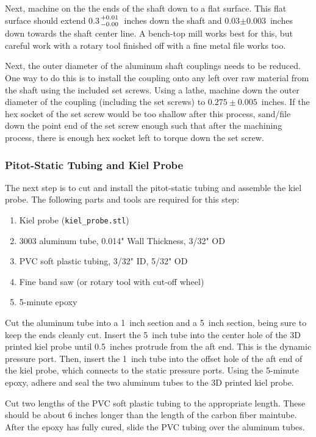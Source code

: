 \documentclass[10pt,onecolumn]{article}
\newcommand{\tol}[2]{\genfrac{}{}{0pt}{}{+#1}{-#2}}
\begin{document}
			Next, machine on the the ends of the shaft down to a flat surface. This flat surface should extend 0.3$\tol{0.01}{0.00}$~inches down the shaft and 0.03$\pm$0.003~inches down towards the shaft center line. A bench-top mill works best for this, but careful work with a rotary tool finished off with a fine metal file works too.
			
			Next, the outer diameter of the aluminum shaft couplings needs to be reduced. One way to do this is to install the coupling onto any left over raw material from the shaft using the included set screws. Using a lathe, machine down the outer diameter of the coupling (including the set screws) to $0.275\pm0.005$~inches. If the hex socket of the set screw would be too shallow after this process, sand/file down the point end of the set screw enough such that after the machining process, there is enough hex socket left to torque down the set screw.
		
		\subsubsection{Pitot-Static Tubing and Kiel Probe}
		
			The next step is to cut and install the pitot-static tubing and assemble the kiel probe. The following parts and tools are required for this step:
			\begin{enumerate}
				\item Kiel probe (\texttt{kiel\_probe.stl}) 
				\item 3003 aluminum tube, 0.014" Wall Thickness, 3/32" OD
				\item PVC soft plastic tubing, 3/32" ID, 5/32" OD
				\item Fine band saw (or rotary tool with cut-off wheel)
				\item 5-minute epoxy
			\end{enumerate}
		
			Cut the aluminum tube into a 1~inch section and a 5~inch section, being sure to keep the ends cleanly cut. Insert the 5~inch tube into the center hole of the 3D printed kiel probe until 0.5~inches protrude from the aft end. This is the dynamic pressure port. Then, insert the 1~inch tube into the offset hole of the aft end of the kiel probe, which connects to the static pressure ports. Using the 5-minute epoxy, adhere and seal the two aluminum tubes to the 3D printed kiel probe. 
			
			Cut two lengths of the PVC soft plastic tubing to the appropriate length. These should be about 6 inches longer than the length of the carbon fiber maintube. After the epoxy has fully cured, slide the PVC tubing over the aluminum tubes.
		
\end{document}
